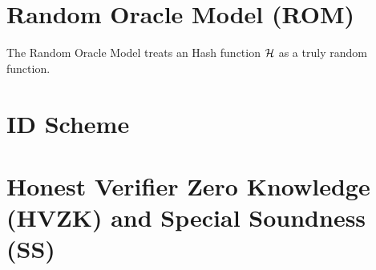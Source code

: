 \section{Random Oracle Model (ROM)}
The Random Oracle Model treats an Hash function $\mathcal{H}$ as a truly random function.

\section{ID Scheme}

\section{Honest Verifier Zero Knowledge (HVZK) and Special Soundness (SS)}